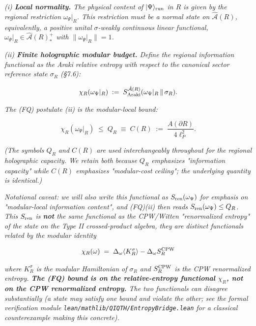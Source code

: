 \documentclass[11pt,a4paper]{article}
\begin{document}
\emph{(i) \textbf{Local normality.} The physical content of $|\Psi\rangle_{\rm run}$ in $R$ is given by the regional restriction $\omega_\Psi|_R$. This restriction must be a normal state on $\hat{\mathcal{A}}(R)$, equivalently, a positive unital $\sigma$-weakly continuous linear functional, $\omega_\Psi|_R \in \hat{\mathcal{A}}(R)_*^+$ with $\|\omega_\Psi|_R\| = 1$.}

\emph{(ii) \textbf{Finite holographic modular budget.} Define the regional information functional as the Araki relative entropy with respect to the canonical sector reference state $\sigma_R$ (§7.6):}

\[
\chi_R(\omega_\Psi|_R) \;:=\; S^{\hat{\mathcal{A}}(R)}_{\rm Araki}(\omega_\Psi|_R \,\|\, \sigma_R).
\]

\emph{The (FQ) postulate (ii) is the modular-local bound:}

\[
\chi_R(\omega_\Psi|_R) \;\le\; Q_R \;\equiv\; C(R) \;:=\; \frac{A(\partial R)}{4\ell_P^2}.
\]

\emph{(The symbols $Q_R$ and $C(R)$ are used interchangeably throughout for the regional holographic capacity. We retain both because $Q_R$ emphasizes "information capacity" while $C(R)$ emphasizes "modular-cost ceiling"; the underlying quantity is identical.)}

\emph{Notational caveat: we will also write this functional as $S_{\rm ren}(\omega_\Psi)$ for emphasis on "modular-local information content", and (FQ)(ii) then reads $S_{\rm ren}(\omega_\Psi) \le Q_R$. This $S_{\rm ren}$ is \textbf{not} the same functional as the CPW/Witten "renormalized entropy" of the state on the Type II crossed-product algebra, they are distinct functionals related by the modular identity}

\[
\chi_R(\omega) \;=\; \Delta_\omega \langle K_R^\sigma \rangle - \Delta_\omega S_R^{\rm CPW}
\]

\emph{where $K_R^\sigma$ is the modular Hamiltonian of $\sigma_R$ and $S_R^{\rm CPW}$ is the CPW renormalized entropy. \textbf{The (FQ) bound is on the relative-entropy functional $\chi_R$, not on the CPW renormalized entropy.} The two functionals can disagree substantially (a state may satisfy one bound and violate the other; see the formal verification module \texttt{lean/mathlib/QIQTH/EntropyBridge.lean} for a classical counterexample making this concrete).}
\end{document}
